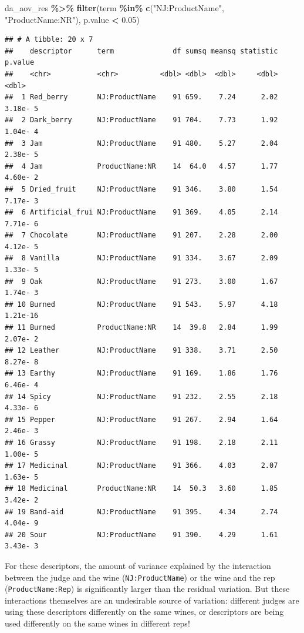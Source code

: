 \documentclass[
]{book}
\newenvironment{Shaded}{\begin{snugshade}}{\end{snugshade}}
\newcommand{\FloatTok}[1]{\textcolor[rgb]{0.00,0.00,0.81}{#1}}
\newcommand{\FunctionTok}[1]{\textcolor[rgb]{0.13,0.29,0.53}{\textbf{#1}}}
\newcommand{\NormalTok}[1]{#1}
\newcommand{\SpecialCharTok}[1]{\textcolor[rgb]{0.81,0.36,0.00}{\textbf{#1}}}
\newcommand{\StringTok}[1]{\textcolor[rgb]{0.31,0.60,0.02}{#1}}
\begin{document}
\begin{Shaded}
\begin{Highlighting}[]
\NormalTok{da\_aov\_res }\SpecialCharTok{\%\textgreater{}\%}
  \FunctionTok{filter}\NormalTok{(term }\SpecialCharTok{\%in\%} \FunctionTok{c}\NormalTok{(}\StringTok{"NJ:ProductName"}\NormalTok{, }\StringTok{"ProductName:NR"}\NormalTok{),}
\NormalTok{         p.value }\SpecialCharTok{\textless{}} \FloatTok{0.05}\NormalTok{)}
\end{Highlighting}
\end{Shaded}

\begin{verbatim}
## # A tibble: 20 x 7
##    descriptor      term              df sumsq meansq statistic  p.value
##    <chr>           <chr>          <dbl> <dbl>  <dbl>     <dbl>    <dbl>
##  1 Red_berry       NJ:ProductName    91 659.    7.24      2.02 3.18e- 5
##  2 Dark_berry      NJ:ProductName    91 704.    7.73      1.92 1.04e- 4
##  3 Jam             NJ:ProductName    91 480.    5.27      2.04 2.38e- 5
##  4 Jam             ProductName:NR    14  64.0   4.57      1.77 4.60e- 2
##  5 Dried_fruit     NJ:ProductName    91 346.    3.80      1.54 7.17e- 3
##  6 Artificial_frui NJ:ProductName    91 369.    4.05      2.14 7.71e- 6
##  7 Chocolate       NJ:ProductName    91 207.    2.28      2.00 4.12e- 5
##  8 Vanilla         NJ:ProductName    91 334.    3.67      2.09 1.33e- 5
##  9 Oak             NJ:ProductName    91 273.    3.00      1.67 1.74e- 3
## 10 Burned          NJ:ProductName    91 543.    5.97      4.18 1.21e-16
## 11 Burned          ProductName:NR    14  39.8   2.84      1.99 2.07e- 2
## 12 Leather         NJ:ProductName    91 338.    3.71      2.50 8.27e- 8
## 13 Earthy          NJ:ProductName    91 169.    1.86      1.76 6.46e- 4
## 14 Spicy           NJ:ProductName    91 232.    2.55      2.18 4.33e- 6
## 15 Pepper          NJ:ProductName    91 267.    2.94      1.64 2.46e- 3
## 16 Grassy          NJ:ProductName    91 198.    2.18      2.11 1.00e- 5
## 17 Medicinal       NJ:ProductName    91 366.    4.03      2.07 1.63e- 5
## 18 Medicinal       ProductName:NR    14  50.3   3.60      1.85 3.42e- 2
## 19 Band-aid        NJ:ProductName    91 395.    4.34      2.74 4.04e- 9
## 20 Sour            NJ:ProductName    91 390.    4.29      1.61 3.43e- 3
\end{verbatim}

For these descriptors, the amount of variance explained by the interaction between the judge and the wine (\texttt{NJ:ProductName}) or the wine and the rep (\texttt{ProductName:Rep}) is significantly larger than the residual variation. But these interactions themselves are an undesirable source of variation: different judges are using these descriptors differently on the same wines, or descriptors are being used differently on the same wines in different reps!
\end{document}
